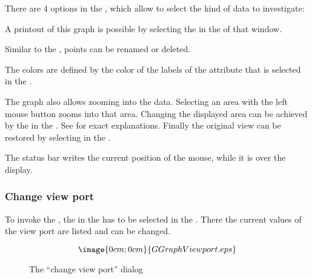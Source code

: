 There are 4 options in the , which allow
to select the kind of data to investigate:


A printout of this graph is possible by selecting the 
in the  of that window.

Similar to the 
, points can be renamed
or deleted. 


The colors are defined by the color of the labels of the attribute that is
selected in the .

The graph also allows zooming into the data.
Selecting an area with the left mouse button zooms into that
area. 
Changing the displayed area can be achieved by the
 in the . See
for exact explanations.
Finally the original view can be restored by selecting
 in the .

The status bar writes the current position of the mouse, while it is over the
display.

\subsubsection{Change view port}%
\label{timestring.graph.viewport}
To invoke the 
,
the  in the  has to be selected 
in the
.
There the current values of the view port are listed and can be changed.
\begin{figure}[h]
$$\image{0cm;0cm}{GGraphViewport.eps}$$%
\caption{The ``change view port'' dialog}%
\label{timestring.graph.viewport.dialog}
\end{figure}

